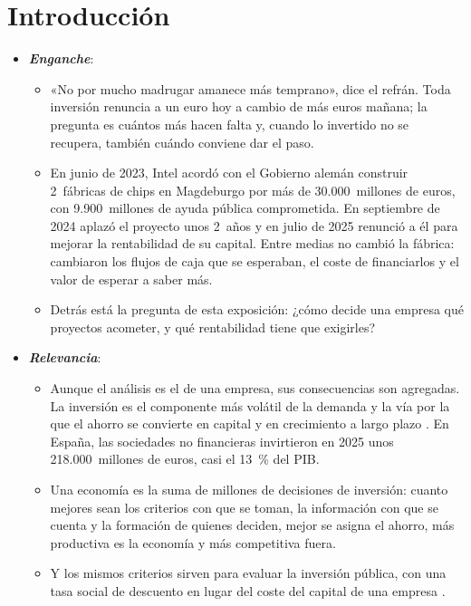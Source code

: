 \documentclass[11pt]{article}
\begin{document}
\tceetitulo

\section*{Introducción}

\begin{itemize}
\item \textbf{\emph{Enganche}}:
  \begin{itemize}
  \item «No por mucho madrugar amanece más temprano», dice el refrán. Toda inversión renuncia a un euro hoy a cambio de más euros mañana; la pregunta es cuántos más hacen falta y, cuando lo invertido no se recupera, también cuándo conviene dar el paso.
  \item En junio de 2023, Intel acordó con el Gobierno alemán construir 2~fábricas de chips en Magdeburgo por más de 30.000~millones de euros\nocite{Intel2023Magdeburg}, con 9.900~millones de ayuda pública comprometida\nocite{Bundesregierung2023Intel}. En septiembre de 2024 aplazó el proyecto unos 2~años\nocite{Intel2024Gelsinger} y en julio de 2025 renunció a él para mejorar la rentabilidad de su capital\nocite{Intel2025Q2}. Entre medias no cambió la fábrica: cambiaron los flujos de caja que se esperaban, el coste de financiarlos y el valor de esperar a saber más.
  \item Detrás está la pregunta de esta exposición: ¿cómo decide una empresa qué proyectos acometer, y qué rentabilidad tiene que exigirles?
  \end{itemize}

\item \textbf{\emph{Relevancia}}:
  \begin{itemize}
  \item Aunque el análisis es el de una empresa, sus consecuencias son agregadas. La inversión es el componente más volátil de la demanda  y la vía por la que el ahorro se convierte en capital y en crecimiento a largo plazo . En España, las sociedades no financieras invirtieron en 2025 unos 218.000~millones de euros, casi el 13~\% del PIB\nocite{Eurostat2026Sectores}.
  \item Una economía es la suma de millones de decisiones de inversión: cuanto mejores sean los criterios con que se toman, la información con que se cuenta y la formación de quienes deciden, mejor se asigna el ahorro, más productiva es la economía y más competitiva fuera.
  \item Y los mismos criterios sirven para evaluar la inversión pública, con una tasa social de descuento en lugar del coste del capital de una empresa .
  \end{itemize}


\end{itemize}
\end{document}
